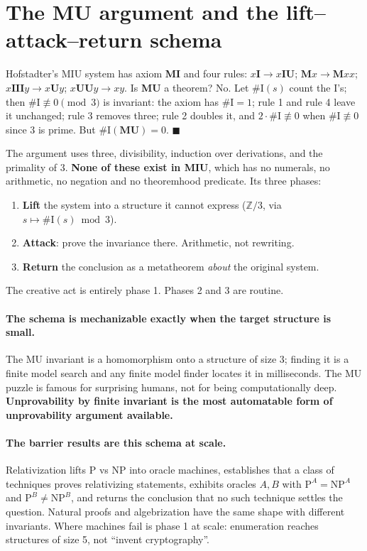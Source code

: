 \documentclass[11pt,a4paper]{article}
\begin{document}
\section{The MU argument and the lift--attack--return schema}\label{sec:mu}

Hofstadter's MIU system has axiom \textbf{MI} and four rules: $x\textbf{I} \to
x\textbf{IU}$; $\textbf{M}x \to \textbf{M}xx$; $x\textbf{III}y \to
x\textbf{U}y$; $x\textbf{UU}y \to xy$. Is \textbf{MU} a theorem? No. Let
$\#\mathrm{I}(s)$ count the I's; then $\#\mathrm{I} \not\equiv 0 \pmod 3$ is
invariant: the axiom has $\#\mathrm{I}=1$; rule 1 and rule 4 leave it unchanged;
rule 3 removes three; rule 2 doubles it, and $2 \cdot \#\mathrm{I} \not\equiv 0$
when $\#\mathrm{I} \not\equiv 0$ since $3$ is prime. But $\#\mathrm{I}
(\textbf{MU}) = 0$. $\blacksquare$

The argument uses three, divisibility, induction over derivations, and the
primality of $3$. \textbf{None of these exist in MIU}, which has no numerals,
no arithmetic, no negation and no theoremhood predicate. Its three phases:

\begin{enumerate}
\item \textbf{Lift} the system into a structure it cannot express
($\mathbb{Z}/3$, via $s \mapsto \#\mathrm{I}(s) \bmod 3$).
\item \textbf{Attack}: prove the invariance there. Arithmetic, not rewriting.
\item \textbf{Return} the conclusion as a metatheorem \emph{about} the original
system.
\end{enumerate}

The creative act is entirely phase 1. Phases 2 and 3 are routine.

\paragraph{The schema is mechanizable exactly when the target structure is
small.} The MU invariant is a homomorphism onto a structure of size 3; finding
it is a finite model search and any finite model finder locates it in
milliseconds. The MU puzzle is famous for surprising humans, not for being
computationally deep. \textbf{Unprovability by finite invariant is the most
automatable form of unprovability argument available.}

\paragraph{The barrier results are this schema at scale.} Relativization lifts
P vs NP into oracle machines, establishes that a class of techniques proves
relativizing statements, exhibits oracles $A, B$ with $\mathrm{P}^A =
\mathrm{NP}^A$ and $\mathrm{P}^B \neq \mathrm{NP}^B$, and returns the
conclusion that no such technique settles the question. Natural proofs and
algebrization have the same shape with different invariants. Where machines
fail is phase 1 at scale: enumeration reaches structures of size 5, not
``invent cryptography''.
\end{document}
